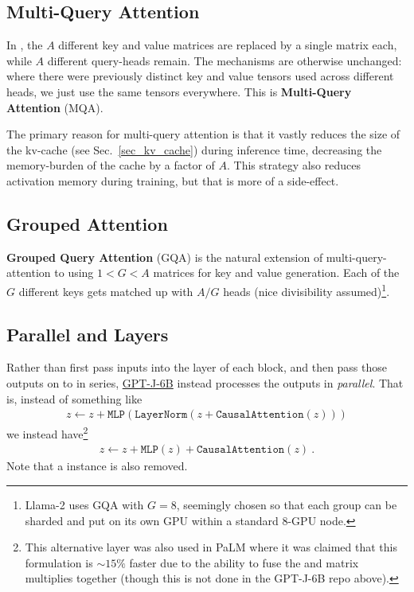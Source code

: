 \subsection{Multi-Query Attention \label{subsec_multi_query_attn}}

In \cite{shazeer2019fast}, the $ A $ different key and value matrices are replaced by a single
matrix each, while $ A$ different query-heads remain. The mechanisms are otherwise unchanged: where
there were previously distinct key and value tensors used across different heads, we just use the same
tensors everywhere. This is \textbf{Multi-Query Attention} (MQA).


The primary reason for multi-query attention is that it vastly reduces the size of the kv-cache (see
Sec.~\ref{sec_kv_cache}) during inference time, decreasing the memory-burden of the cache by a
factor of $ A $. This strategy also reduces activation memory during training, but that is more of a
side-effect.

\subsection{Grouped Attention \label{subsec_grouped_attn}}

\textbf{Grouped Query Attention} (GQA) \cite{ainslie2023gqa} is the natural extension of
multi-query-attention to using $ 1<G<A $ matrices for key and value generation. Each of the $G$
different keys gets matched up with $A/G$ heads (nice divisibility assumed)\footnote{Llama-2
    \cite{touvron2023llama2} uses GQA with $ G=8 $, seemingly chosen so that each group can be
sharded and put on its own GPU within a standard 8-GPU node.}.


\subsection{Parallel  and  Layers}

Rather than first pass inputs into the  layer of each block, and then pass
those outputs on to  in series, \href{https://github.com/kingoflolz/mesh-transformer-jax/blob/f8315e3003033b23f21d78361b288953064e0e76/mesh_transformer/layers.py#L303}{GPT-J-6B}
instead processes the  outputs in \textit{parallel}. That is, instead of something
like
\begin{align}
	z \leftarrow z + \texttt{MLP}\left ( \texttt{LayerNorm}\left ( z + \texttt{CausalAttention}\left ( z \right ) \right ) \right )
\end{align}
we instead have\footnote{This alternative layer was also used in PaLM \cite{chowdhery2022palm} where it
	was claimed that this formulation is $\sim 15\%$ faster due to the ability to fuse the 
	and  matrix multiplies together (though this is not done in the GPT-J-6B repo above).}
\begin{align}
	z \leftarrow z + \texttt{MLP}\left ( z \right )    + \texttt{CausalAttention}\left ( z \right )\ .
\end{align}
Note that a  instance is also removed.



